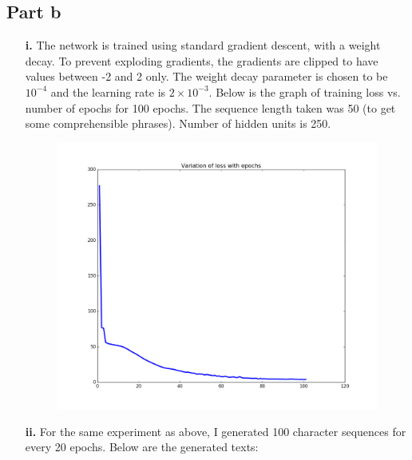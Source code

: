 \documentclass{article}
\begin{document}
\subsection*{Part b}
\begin{flushleft}
\begin{itemize}
\item [\textbf{i.}] The network is trained using standard gradient descent, with a weight decay. To prevent exploding gradients, the gradients are clipped to have values between -2 and 2 only. The weight decay parameter is chosen to be \(10^{-4}\) and the learning rate is \(2\times 10^{-3}\). Below is the graph of training loss vs. number of epochs for 100 epochs. The sequence length taken was 50 (to get some comprehensible phrases). Number of hidden units is 250.

\begin{figure}[H]
\centering
\includegraphics[width=0.75\linewidth]{RNN_training.png}
\end{figure}
\newpage
\item [\textbf{ii.}] For the same experiment as above, I generated 100 character sequences for every 20 epochs. Below are the generated texts:\\
\end{itemize}
\end{flushleft}
\end{document}
